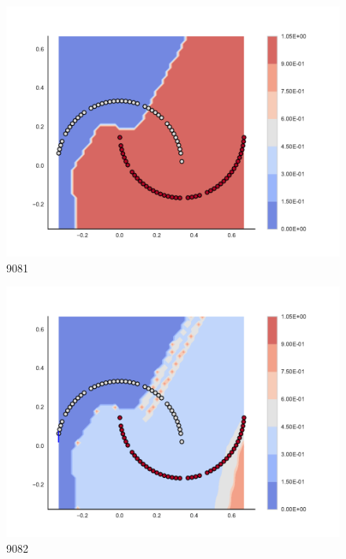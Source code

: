 \begin{subfigure}[b]{0.09\textwidth}
    \includegraphics[clip, trim=2.35cm 1.75cm 4.5cm 0cm,width=\textwidth]{img/convergence/9081.pdf}
    \caption{9081}
    \label{fig:convergence_9081}
\end{subfigure}
%
\begin{subfigure}[b]{0.09\textwidth}
    \includegraphics[clip, trim=2.35cm 1.75cm 4.5cm 0cm,width=\textwidth]{img/convergence/9082.pdf}
    \caption{9082}
    \label{fig:convergence_9082}
\end{subfigure}
%
